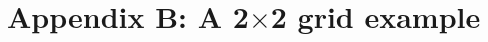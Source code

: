 \documentclass{article}
\newcommand{\code}[1]{\texttt{#1}}
\begin{document}
%
%
%
%
%		
%

\section*{Appendix B: A 2$\times$2 grid example}


%
%	 
	 
\end{document}
